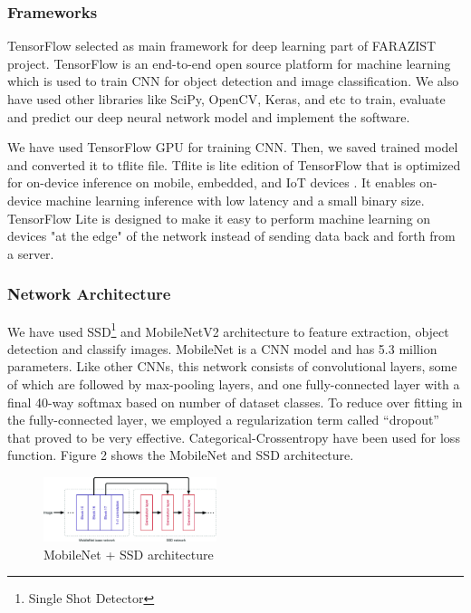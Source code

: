 \documentclass[conference]{IEEEtran}
\begin{document}
\subsubsection{Frameworks}
TensorFlow selected as main framework for deep learning part of FARAZIST project. TensorFlow is an end-to-end open source platform for machine learning \cite{2020t}\cite{abadi2016tensorflow} which is used to train CNN for object detection and image classification. We also have used other libraries like SciPy, OpenCV, Keras, and etc to train, evaluate and predict our deep neural network model and implement the software. \par
We have used TensorFlow GPU for training CNN. Then, we saved trained model and converted it to tflite file. Tflite is lite edition of TensorFlow that is optimized for on-device inference on mobile, embedded, and IoT devices \cite{tensorflow-lite}. It enables on-device machine learning inference with low latency and a small binary size. TensorFlow Lite is designed to make it easy to perform machine learning on devices "at the edge" of the network instead of sending data back and forth from a server.

\subsubsection{Network Architecture}
We have used SSD\footnote{Single Shot Detector} and MobileNetV2 \cite{s2018mobilenetv2} architecture to feature extraction, object detection and classify images. MobileNet is a CNN model and has 5.3 million parameters. Like other CNNs, this network consists of convolutional layers, some of which are followed by max-pooling layers, and one fully-connected layer with a final 40-way softmax based on number of dataset classes.
\pre
To reduce over fitting in the fully-connected layer, we employed a regularization term called “dropout” that proved to be very effective. Categorical-Crossentropy have been used for loss function.
Figure 2 shows the MobileNet and SSD architecture.

\begin{figure}
    \centering
    \includegraphics[width=0.45\textwidth]{mobilenet-ssd.png}
    \caption{MobileNet + SSD architecture}
\end{figure}
\end{document}
